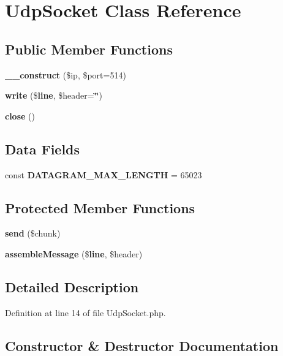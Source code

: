 \section{Udp\+Socket Class Reference}
\label{class_monolog_1_1_handler_1_1_syslog_udp_1_1_udp_socket}
\subsection*{Public Member Functions}
\begin{DoxyCompactItemize}
\item 
{\bf \+\_\+\+\_\+construct} (\$ip, \$port=514)
\item 
{\bf write} (\${\bf line}, \$header=\char`\"{}\char`\"{})
\item 
{\bf close} ()
\end{DoxyCompactItemize}
\subsection*{Data Fields}
\begin{DoxyCompactItemize}
\item 
const {\bf D\+A\+T\+A\+G\+R\+A\+M\+\_\+\+M\+A\+X\+\_\+\+L\+E\+N\+G\+T\+H} = 65023
\end{DoxyCompactItemize}
\subsection*{Protected Member Functions}
\begin{DoxyCompactItemize}
\item 
{\bf send} (\$chunk)
\item 
{\bf assemble\+Message} (\${\bf line}, \$header)
\end{DoxyCompactItemize}


\subsection{Detailed Description}


Definition at line 14 of file Udp\+Socket.\+php.



\subsection{Constructor \& Destructor Documentation}

